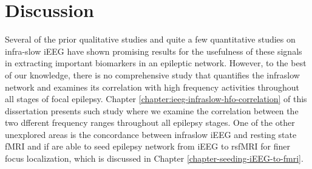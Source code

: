 \section{Discussion}
Several of the prior qualitative studies and quite a few quantitative studies on infra-slow iEEG have shown promising results for the usefulness of these signals in extracting important biomarkers in an epileptic network. However, to the best of our knowledge, there is no comprehensive study that quantifies the infraslow network and examines its correlation with high frequency activities throughout all stages of focal epilepsy. Chapter \ref{chapter:ieeg-infraslow-hfo-correlation} of this dissertation presents such study where we examine the correlation between the two dfferent frequency ranges throughout all epilepsy stages.
One of the other unexplored areas is the concordance between infraslow iEEG and resting state fMRI and if are able to seed epilepsy network from iEEG to rsfMRI for finer focus localization, which is discussed in Chapter \ref{chapter-seeding-iEEG-to-fmri}.